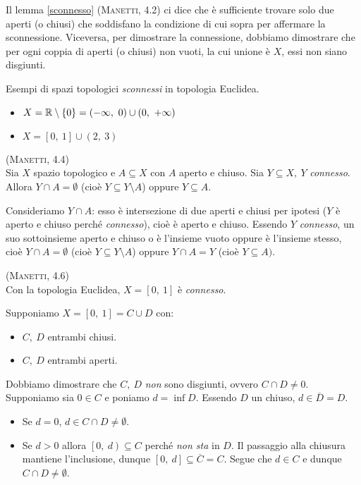 \begin{observe}
	Il lemma \ref{sconnesso} \textsc{(Manetti, 4.2)} ci dice che è sufficiente trovare solo due aperti (o chiusi) che soddisfano la condizione di cui sopra per affermare la sconnessione. Viceversa, per dimostrare la connessione, dobbiamo dimostrare che per ogni coppia di aperti (o chiusi) non vuoti, la cui unione è $X$, essi non siano disgiunti.
\end{observe}
\begin{example} Esempi di spazi topologici \textit{sconnessi} in topologia Euclidea.
	\begin{itemize}
		\item $X=\realset\setminus\left\{0\right\}=\left(-\infty,\ 0\right)\cup \left(0,\ +\infty\right)$
		\item $X=\left[0,\ 1\right]\cup \left(2,\ 3\right)$
	\end{itemize}
\end{example}
\begin{lemming}\textsc{(Manetti, 4.4)}\\
Sia $X$ spazio topologico e $A\subseteq X$ con $A$ aperto e chiuso. Sia $Y\subseteq X,\ Y$ \textit{connesso}. Allora $Y\cap A=\emptyset$ (cioè $Y\subseteq Y\setminus A$) oppure $Y\subseteq A$. 
\end{lemming}
\begin{demonstration}
Consideriamo $Y\cap A$: esso è intersezione di due aperti e chiusi per ipotesi ($Y$ è aperto e chiuso perché \textit{connesso}), cioè è aperto e chiuso. Essendo $Y$ \textit{connesso}, un suo sottoinsieme aperto e chiuso o è l'insieme vuoto oppure è l'insieme stesso, cioè $Y\cap A=\emptyset$ (cioè $Y\subseteq Y\setminus A$) oppure $Y\cap A=Y$ (cioè $Y\subseteq A)$.
\end{demonstration}
\begin{theorema}\textsc{(Manetti, 4.6)}\\
Con la topologia Euclidea, $X=\left[0,\ 1\right]$ è \textit{connesso}.
\end{theorema}
\begin{demonstration}
Supponiamo $X=\left[0,\ 1\right]=C\cup D$ con:
\begin{itemize}
	\item $C,\ D$ entrambi chiusi.
	\item $C,\ D$ entrambi aperti.
\end{itemize}
Dobbiamo dimostrare che $C,\ D$ \textit{non} sono disgiunti, ovvero $C\cap D\neq 0$. Supponiamo sia $0\in C$ e poniamo $d=\inf D$. Essendo $D$ un chiuso, $d\in \overline{D}=D$.
\begin{itemize}
	\item Se $d=0$, $d\in C\cap D\neq \emptyset$.
	\item Se $d>0$ allora $\left[0,\ d\right)\subseteq C$ perché \textit{non sta} in $D$. Il passaggio alla chiusura mantiene l'inclusione, dunque $\left[0,\ d\right]\subseteq \overline{C}=C$. Segue che $d\in C$ e dunque $C\cap D\neq \emptyset$.
\end{itemize}
\end{demonstration}
